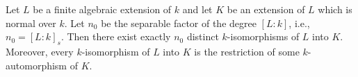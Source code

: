 Let $L$ be a finite algebraic extension of $k$ and let $K$ be an extension of $L$ which is normal over $k$. Let $n_0$ be the separable factor of the degree $[L:k]$, i.e., $n_0 = [L:k]_s$. Then there exist exactly $n_0$ distinct $k$-isomorphisms of $L$ into $K$. Moreover, every $k$-isomorphism of $L$ into $K$ is the restriction of some $k$-automorphism of $K$.

